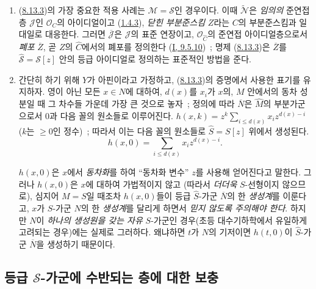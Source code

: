 \begin{remark}[8.13.4]
\label{II.8.13.4-ko}
\begin{enumerate}
  \item[\rm{(i)}] (\hyperref[II.8.13.3-ko]{8.13.3})의 가장 중요한 적용
  사례는 $\mathcal{M}=\mathcal{S}$인 경우이다. 이때
  $\widetilde{\mathcal{N}}$은 \emph{임의의} 준연접층 $\mathcal{J}$인
  $\mathcal{O}_C$의 아이디얼이고 (\hyperref[II.1.4.3-ko]{1.4.3}),
  \emph{닫힌 부분준스킴} $Z$라는 $C$의 부분준스킴과 일대일로 대응한다.
  그러면 $\overline{\mathcal{J}}$은 $\mathcal{J}$의 표준 연장이고,
  $\mathcal{O}_{\widehat{C}}$의 준연접 아이디얼층으로서 \emph{폐포}
  $\overline{Z}$, 곧 $Z$의 $\widehat{C}$에서의 폐포를 정의한다
  (\hyperref[I.9.5.10-ko]{I, 9.5.10})~; 명제
  (\hyperref[II.8.13.3-ko]{8.13.3})은 $\overline{Z}$를
  $\widehat{\mathcal{S}}=\mathcal{S}[z]$ 안의 등급 아이디얼로 정의하는
  표준적인 방법을 준다.
  \item[\rm{(ii)}] 간단히 하기 위해 $Y$가 아핀이라고 가정하고,
  (\hyperref[II.8.13.3-ko]{8.13.3})의 증명에서 사용한 표기를 유지하자.
  영이 아닌 모든 $x\in N$에 대하여, $d(x)$를 $x_i$가 $x$의,
  $M$ 안에서의 동차 성분일 때 그 차수들 가운데 가장 큰 것으로 놓자~;
  정의에 따라 $\overline{N}$은 $\widehat{M}$의 부분가군으로서 $0$과
  다음 꼴의 원소들로 이루어진다.
  $h(x,k)=z^k\sum_{i\leqslant d(x)}x_i z^{d(x)-i}$ ($k$는
  $\geqslant0$인 정수)~; 따라서 이는 다음 꼴의 원소들로
  $\widehat{S}=S[z]$ 위에서 생성된다.
  \[
    h(x,0)=\sum_{i\leqslant d(x)}x_i z^{d(x)-i}.
  \]

  $h(x,0)$은 $x$에서 \emph{동차화}를 하여 ``동차화 변수'' $z$를
  사용해 얻어진다고 말한다. 그러나 $h(x,0)$은 $x$에 대하여 가법적이지
  않고 (따라서 \emph{더더욱} $S$-선형이지 않으므로), 심지어 $M=S$일
  때조차 $h(x,0)$들이 등급 $\widehat{S}$-가군 $\overline{N}$의 한
  \emph{생성계}를 이룬다고, $x$가 $S$-가군 $N$의 한 \emph{생성계}를
  달리게 하면서 \emph{믿지 않도록 주의해야 한다}. 하지만 $N$이
  \emph{하나의 생성원을 갖는 자유} $S$-가군인 경우(초등 대수기하학에서
  유일하게 고려되는 경우)에는 실제로 그러하다. 왜냐하면 $t$가 $N$의
  기저이면 $h(t,0)$이 $\widehat{S}$-가군 $\overline{N}$을 생성하기
  때문이다.
\end{enumerate}
\end{remark}

\subsection{등급 $\mathcal{S}$-가군에 수반되는 층에 대한 보충}
\label{subsection:II.8.14-ko}

